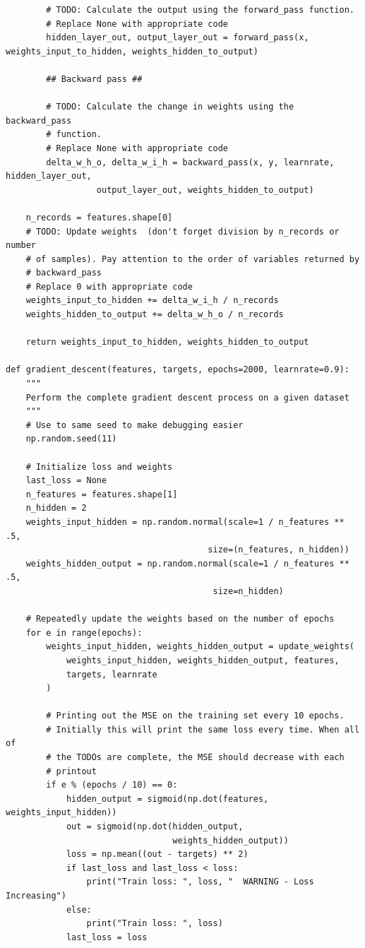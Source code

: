 \begin{lstlisting}
        # TODO: Calculate the output using the forward_pass function.
        # Replace None with appropriate code
        hidden_layer_out, output_layer_out = forward_pass(x, weights_input_to_hidden, weights_hidden_to_output)
        
        ## Backward pass ##
        
        # TODO: Calculate the change in weights using the backward_pass
        # function.
        # Replace None with appropriate code
        delta_w_h_o, delta_w_i_h = backward_pass(x, y, learnrate, hidden_layer_out,
                  output_layer_out, weights_hidden_to_output)

    n_records = features.shape[0]
    # TODO: Update weights  (don't forget division by n_records or number
    # of samples). Pay attention to the order of variables returned by
    # backward_pass
    # Replace 0 with appropriate code
    weights_input_to_hidden += delta_w_i_h / n_records
    weights_hidden_to_output += delta_w_h_o / n_records
    
    return weights_input_to_hidden, weights_hidden_to_output

def gradient_descent(features, targets, epochs=2000, learnrate=0.9):
    """
    Perform the complete gradient descent process on a given dataset
    """
    # Use to same seed to make debugging easier
    np.random.seed(11)
    
    # Initialize loss and weights
    last_loss = None
    n_features = features.shape[1]
    n_hidden = 2
    weights_input_hidden = np.random.normal(scale=1 / n_features ** .5,
                                        size=(n_features, n_hidden))
    weights_hidden_output = np.random.normal(scale=1 / n_features ** .5,
                                         size=n_hidden)

    # Repeatedly update the weights based on the number of epochs
    for e in range(epochs):
        weights_input_hidden, weights_hidden_output = update_weights(
            weights_input_hidden, weights_hidden_output, features,
            targets, learnrate
        )

        # Printing out the MSE on the training set every 10 epochs.
        # Initially this will print the same loss every time. When all of
        # the TODOs are complete, the MSE should decrease with each
        # printout
        if e % (epochs / 10) == 0:
            hidden_output = sigmoid(np.dot(features, weights_input_hidden))
            out = sigmoid(np.dot(hidden_output,
                                 weights_hidden_output))
            loss = np.mean((out - targets) ** 2)
            if last_loss and last_loss < loss:
                print("Train loss: ", loss, "  WARNING - Loss Increasing")
            else:
                print("Train loss: ", loss)
            last_loss = loss
            

\end{lstlisting}
